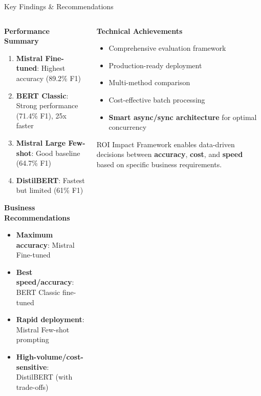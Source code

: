 \documentclass[aspectratio=169]{beamer}
\begin{document}
\begin{frame}{Key Findings \& Recommendations}
\begin{columns}
\begin{column}{0.5\textwidth}
\textbf{Performance Summary}
\begin{enumerate}
\item \textbf{Mistral Fine-tuned}: Highest accuracy (89.2\% F1)
\item \textbf{BERT Classic}: Strong performance (71.4\% F1), 25x faster
\item \textbf{Mistral Large Few-shot}: Good baseline (64.7\% F1)
\item \textbf{DistilBERT}: Fastest but limited (61\% F1)
\end{enumerate}

\vspace{0.3cm}
\textbf{Business Recommendations}
\begin{itemize}
\item \textbf{Maximum accuracy}: Mistral Fine-tuned
\item \textbf{Best speed/accuracy}: BERT Classic fine-tuned
\item \textbf{Rapid deployment}: Mistral Few-shot prompting
\item \textbf{High-volume/cost-sensitive}: DistilBERT (with trade-offs)
\end{itemize}
\end{column}
\begin{column}{0.5\textwidth}
\textbf{Technical Achievements}
\begin{itemize}
\item Comprehensive evaluation framework
\item Production-ready deployment
\item Multi-method comparison
\item Cost-effective batch processing
\item \textbf{Smart async/sync architecture} for optimal concurrency
\end{itemize}

\vspace{0.3cm}
\begin{alertblock}{ROI Impact}
Framework enables data-driven decisions between \textbf{accuracy}, \textbf{cost}, and \textbf{speed} based on specific business requirements.
\end{alertblock}
\end{column}
\end{columns}
\end{frame}
\end{document}
